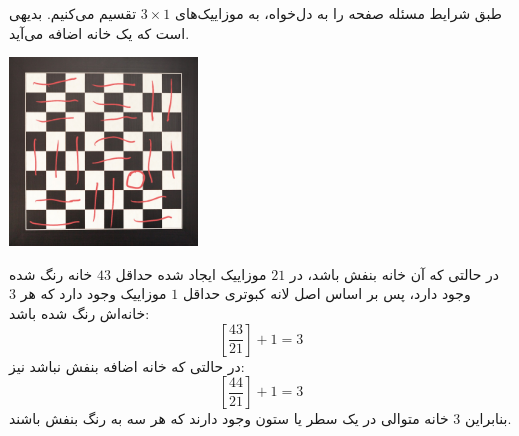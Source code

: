 \p
طبق شرایط مسئله صفحه را به دل‌خواه، به موزاییک‌های 
$3\times1$ 
تقسیم می‌کنیم. بدیهی است که یک خانه اضافه می‌آید.
	\p
\begin{center}
    \includegraphics[height=5cm]{Q3Pic.jpg}
\end{center}
	\p
 در حالتی که آن خانه بنفش باشد، در
$21$ 
موزاییک ایجاد شده حداقل
$43$
خانه رنگ شده وجود دارد، پس بر اساس اصل لانه کبوتری حداقل 
$1$
موزاییک وجود دارد که هر 
$3$ 
خانه‌اش رنگ شده باشد:
\[[\frac {43} {21}]+1=3\]  
در حالتی که خانه اضافه بنفش نباشد نیز:
\[[\frac {44} {21}]+1=3\]  
بنابراین 
$3$
 خانه متوالی در یک سطر یا ستون وجود دارند که هر سه به رنگ بنفش باشند.